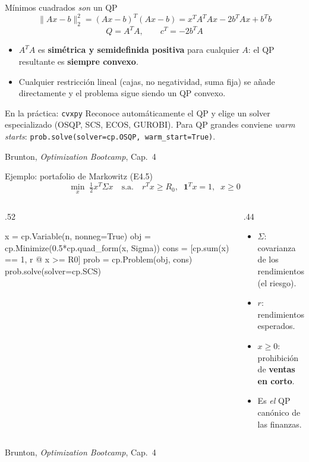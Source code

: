 \documentclass[10pt,aspectratio=169]{beamer}
\newcommand{\fuente}{\vfill{\scriptsize\color{gray}Brunton, \emph{Optimization Bootcamp}, Cap.~4}}
\begin{document}
\begin{frame}{Mínimos cuadrados \emph{son} un QP}
  \small
  \[
    \|Ax-b\|_2^2 = (Ax-b)^T(Ax-b)
                 = x^TA^TAx - 2b^TAx + b^Tb \tag{4.52}
  \]
  \[
    Q = A^TA, \qquad c^T = -2b^TA \tag{4.53}
  \]

  \begin{itemize}
    \item $A^TA$ es \textbf{simétrica y semidefinida positiva} para cualquier
      $A$: el QP resultante es \textbf{siempre convexo}.
    \item Cualquier restricción lineal (cajas, no negatividad, suma fija)
      se añade directamente y el problema sigue siendo un QP convexo.
  \end{itemize}

  \begin{block}{En la práctica: \texttt{cvxpy}}
    \small
    Reconoce automáticamente el QP y elige un solver especializado (OSQP,
    SCS, ECOS, GUROBI). Para QP grandes conviene \emph{warm starts}:
    \texttt{prob.solve(solver=cp.OSQP, warm\_start=True)}.
  \end{block}
  \fuente
\end{frame}

\begin{frame}[fragile]{Ejemplo: portafolio de Markowitz (E4.5)}
  \small
  \[
    \min_x \; \tfrac12 x^T\Sigma x
    \quad\text{s.a.}\quad
    r^Tx \ge R_0,\;\; \mathbf{1}^Tx = 1,\;\; x \ge 0
  \]
  \begin{columns}[T,onlytextwidth]
    \begin{column}{.52\textwidth}
      \begin{semiverbatim}
x = cp.Variable(n, nonneg=True)
obj = cp.Minimize(0.5*cp.quad_form(x,
                                 Sigma))
cons = [cp.sum(x) == 1,
        r @ x >= R0]
prob = cp.Problem(obj, cons)
prob.solve(solver=cp.SCS)
      \end{semiverbatim}
    \end{column}
    \begin{column}{.44\textwidth}
      \footnotesize
      \begin{itemize}
        \item $\Sigma$: covarianza de los rendimientos (el riesgo).
        \item $r$: rendimientos esperados.
        \item $x\ge 0$: prohibición de \textbf{ventas en corto}.
        \item Es \emph{el} QP canónico de las finanzas.
      \end{itemize}
    \end{column}
  \end{columns}
  \fuente
\end{frame}
\end{document}
